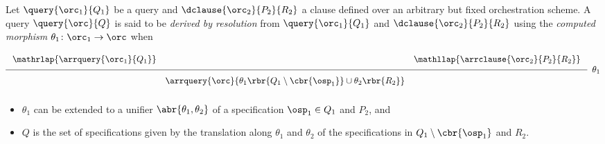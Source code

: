 \documentclass{LMCS}
\begin{document}
  \begin{defi}[Resolution]
    Let \(\query{\orc_{1}}{Q_{1}}\) be a query and \(\dclause{\orc_{2}}{P_{2}}{R_{2}}\) a clause defined over an arbitrary but fixed orchestration scheme.
    A query \(\query{\orc}{Q}\) is said to be \emph{derived by resolution} from \(\query{\orc_{1}}{Q_{1}}\) and \(\dclause{\orc_{2}}{P_{2}}{R_{2}}\) using the \emph{computed morphism} \(\theta_{1} \colon \orc_{1} \to \orc\) when
    \[
    \xymatrix @H=4ex @R=0ex @C-2em {
      {\mathrlap{\arrquery{\orc_{1}}{
            Q_{1}
          }
        }}
      && {\mathllap{\arrclause{\orc_{2}}{
            P_{2}
          }{
            R_{2}
          }
        }} \\
      & {\arrquery{\orc}{
          \theta_{1}\rbr{Q_{1} \setminus \cbr{\osp_{1}}} \cup \theta_{2}\rbr{R_{2}}
        }}
      \ar @{-} [ul]!DL-<1ex,0ex>;[ur]!DR+<1ex,0ex> |>/1em/*[r]{\theta_{1}}
    }
    \]
    \begin{itemize}
      
    \item \(\theta_{1}\) can be extended to a unifier \(\abr{\theta_{1}, \theta_{2}}\) of a specification \(\osp_{1} \in Q_{1}\) and \(P_{2}\), and
      
    \item \(Q\) is the set of specifications given by the translation along \(\theta_{1}\) and \(\theta_{2}\) of the specifications in \(Q_{1} \setminus \cbr{\osp_{1}}\) and \(R_{2}\).
      
    \end{itemize}
  \end{defi}
\end{document}
